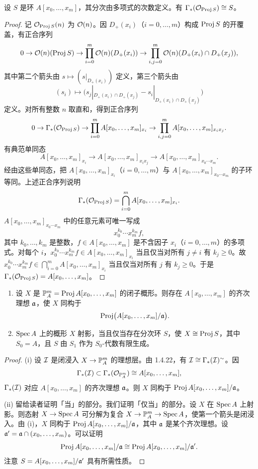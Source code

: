 \begin{lemma}\label{it:1.4.23}
设 $S$ 是环 $A[x_0,\dots,x_m]$，其分次由多项式的次数定义。有 $\Gamma_*(\mathcal{O}_{\operatorname{Proj} S})\cong S$。
\end{lemma}

\begin{proof}
记 $\mathcal{O}_{\operatorname{Proj} S}(n)$ 为 $\mathcal{O}(n)$。因 $D_+(x_i)$（$i=0,\dots,m$）构成 $\operatorname{Proj} S$ 的开覆盖，有正合序列
\[
0\to\mathcal{O}(n)(\operatorname{Proj} S)\to\prod_{i=0}^m\mathcal{O}(n)(D_+(x_i))\to\prod_{i,j=0}^m\mathcal{O}(n)(D_+(x_i)\cap D_+(x_j)),
\]
其中第二个箭头由 $s\mapsto(s|_{D_+(x_i)})$ 定义，第三个箭头由
\[
(s_i)\mapsto\bigl(s_j|_{D_+(x_i)\cap D_+(x_j)}-s_i|_{D_+(x_i)\cap D_+(x_j)}\bigr)
\]
定义。对所有整数 $n$ 取直和，得到正合序列
\[
0\to\Gamma_*(\mathcal{O}_{\operatorname{Proj} S})\to\prod_{i=0}^mA[x_0,\dots,x_m]_{x_i}\to\prod_{i,j=0}^mA[x_0,\dots,x_m]_{x_ix_j}.
\]
有典范单同态
\[
A[x_0,\dots,x_m]_{x_i}\to A[x_0,\dots,x_m]_{x_ix_j}\to A[x_0,\dots,x_m]_{x_0\cdots x_m}.
\]
经由这些单同态，把 $A[x_0,\dots,x_m]_{x_i}$（$i=0,\dots,m$）与 $A[x_0,\dots,x_m]_{x_0\cdots x_m}$ 的子环等同。上述正合序列说明
\[
\Gamma_*(\mathcal{O}_{\operatorname{Proj} S})=\bigcap_{i=0}^mA[x_0,\dots,x_m]_{x_i}.
\]
$A[x_0,\dots,x_m]_{x_0\cdots x_m}$ 中的任意元素可唯一写成
\[
x_0^{k_0}\cdots x_m^{k_m}f,
\]
其中 $k_0,\dots,k_m$ 是整数，$f\in A[x_0,\dots,x_m]$ 是不含因子 $x_i$（$i=0,\dots,m$）的多项式。对每个 $i$，$x_0^{k_0}\cdots x_m^{k_m}f\in A[x_0,\dots,x_m]_{x_i}$ 当且仅当对所有 $j\ne i$ 有 $k_j\ge0$。故 $x_0^{k_0}\cdots x_m^{k_m}f\in\bigcap_{i=0}^mA[x_0,\dots,x_m]_{x_i}$ 当且仅当对所有 $j$ 有 $k_j\ge0$。于是 $\Gamma_*(\mathcal{O}_{\operatorname{Proj} S})=A[x_0,\dots,x_m]$。
\end{proof}

\begin{corollary}\label{it:1.4.24}
\begin{enumerate}[label=(\roman*),leftmargin=2.8em]
  \item 设 $X$ 是 $\mathbb{P}_A^m=\operatorname{Proj} A[x_0,\dots,x_m]$ 的闭子概形。则存在 $A[x_0,\dots,x_m]$ 的齐次理想 $\mathfrak{a}$，使 $X$ 同构于
  \[
  \operatorname{Proj}\bigl(A[x_0,\dots,x_m]/\mathfrak{a}\bigr).
  \]
  \item $\operatorname{Spec} A$ 上的概形 $X$ 射影，当且仅当存在分次环 $S$，使 $X\cong\operatorname{Proj} S$，其中 $S_0=A$，且 $S$ 由 $S_1$ 作为 $S_0$-代数有限生成。
\end{enumerate}
\end{corollary}

\begin{proof}
(i) 设 $\mathcal{I}$ 是闭浸入 $X\to\mathbb{P}_A^m$ 的理想层。由 1.4.22，有 $\mathcal{I}\cong\Gamma_*(\mathcal{I})^\sim$。因
\[
\Gamma_*(\mathcal{I})\subset\Gamma_*(\mathcal{O}_{\mathbb{P}_A^m})\cong A[x_0,\dots,x_m],
\]
$\Gamma_*(\mathcal{I})$ 对应 $A[x_0,\dots,x_m]$ 的齐次理想 $\mathfrak{a}$。则 $X$ 同构于 $\operatorname{Proj} A[x_0,\dots,x_m]/\mathfrak{a}$。

(ii) 留给读者证明「当」的部分。我们证明「仅当」的部分。设 $X$ 在 $\operatorname{Spec} A$ 上射影。则态射 $X\to\operatorname{Spec} A$ 可分解为复合 $X\to\mathbb{P}_A^m\to\operatorname{Spec} A$，使第一个箭头是闭浸入。由 (i)，$X$ 同构于 $\operatorname{Proj} A[x_0,\dots,x_m]/\mathfrak{a}$，其中 $\mathfrak{a}$ 是某个齐次理想。设 $\mathfrak{a}'=\mathfrak{a}\cap(x_0,\dots,x_m)$。可以证明
\[
\operatorname{Proj} A[x_0,\dots,x_m]/\mathfrak{a}\cong\operatorname{Proj} A[x_0,\dots,x_m]/\mathfrak{a}'.
\]
注意 $S=A[x_0,\dots,x_m]/\mathfrak{a}'$ 具有所需性质。
\end{proof}


